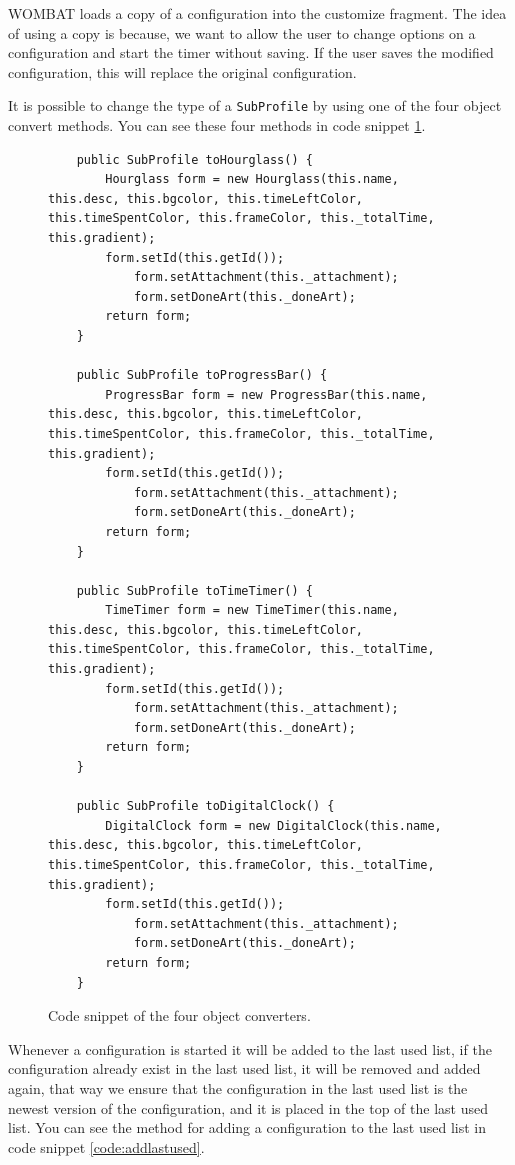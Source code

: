 \begin{description}
	WOMBAT loads a copy of a configuration into the customize fragment. The idea of using a copy is because, we want to allow the user to change options on a configuration and start the timer without saving. If the user saves the modified configuration, this will replace the original configuration.
	
	It is possible to change the type of a \texttt{SubProfile} by using one of the four object convert methods. You can see these four methods in code snippet \ref{code:convert}.
	
	\begin{figure}[H]
\begin{lstlisting}
	public SubProfile toHourglass() {
		Hourglass form = new Hourglass(this.name, this.desc, this.bgcolor, this.timeLeftColor, this.timeSpentColor, this.frameColor, this._totalTime, this.gradient);
		form.setId(this.getId());		
			form.setAttachment(this._attachment);
			form.setDoneArt(this._doneArt);
		return form;
	}

	public SubProfile toProgressBar() {
		ProgressBar form = new ProgressBar(this.name, this.desc, this.bgcolor, this.timeLeftColor, this.timeSpentColor, this.frameColor, this._totalTime, this.gradient);
		form.setId(this.getId());
			form.setAttachment(this._attachment);
			form.setDoneArt(this._doneArt);
		return form;
	}

	public SubProfile toTimeTimer() {
		TimeTimer form = new TimeTimer(this.name, this.desc, this.bgcolor, this.timeLeftColor, this.timeSpentColor, this.frameColor, this._totalTime, this.gradient);
		form.setId(this.getId());
			form.setAttachment(this._attachment);
			form.setDoneArt(this._doneArt);
		return form;
	}

	public SubProfile toDigitalClock() {
		DigitalClock form = new DigitalClock(this.name, this.desc, this.bgcolor, this.timeLeftColor, this.timeSpentColor, this.frameColor, this._totalTime, this.gradient);
		form.setId(this.getId());
			form.setAttachment(this._attachment);
			form.setDoneArt(this._doneArt);
		return form;
	}
\end{lstlisting}
\caption{Code snippet of the four object converters.}%
\label{code:convert}%
\end{figure}
	
	Whenever a configuration is started it will be added to the last used list, if the configuration already exist in the last used list, it will be removed and added again, that way we ensure that the configuration in the last used list is the newest version of the configuration, and it is placed in the top of the last used list. You can see the method for adding a configuration to the last used list in code snippet \ref{code:addlastused}.
	

\end{description}
